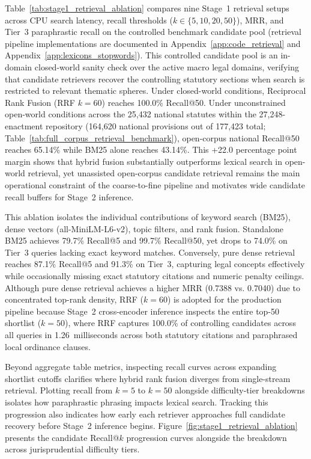 Table~\ref{tab:stage1_retrieval_ablation} compares nine Stage~1 retrieval setups across CPU search latency, recall thresholds ($k \in \{5, 10, 20, 50\}$), MRR, and Tier~3 paraphrastic recall on the controlled benchmark candidate pool (retrieval pipeline implementations are documented in Appendix~\ref{app:code_retrieval} and Appendix~\ref{app:lexicons_stopwords}). This controlled candidate pool is an in-domain closed-world sanity check over the active macro legal domains, verifying that candidate retrievers recover the controlling statutory sections when search is restricted to relevant thematic spheres. Under closed-world conditions, Reciprocal Rank Fusion (RRF $k=60$) reaches 100.0\% Recall@50. Under unconstrained open-world conditions across the 25,432 national statutes within the 27,248-enactment repository (164,620 national provisions out of 177,423 total; Table~\ref{tab:full_corpus_retrieval_benchmark}), open-corpus national Recall@50 reaches 65.14\% while BM25 alone reaches 43.14\%. This +22.0 percentage point margin shows that hybrid fusion substantially outperforms lexical search in open-world retrieval, yet unassisted open-corpus candidate retrieval remains the main operational constraint of the coarse-to-fine pipeline and motivates wide candidate recall buffers for Stage~2 inference.

This ablation isolates the individual contributions of keyword search (BM25), dense vectors (all-MiniLM-L6-v2), topic filters, and rank fusion. Standalone BM25 achieves 79.7\% Recall@5 and 99.7\% Recall@50, yet drops to 74.0\% on Tier~3 queries lacking exact keyword matches. Conversely, pure dense retrieval reaches 87.1\% Recall@5 and 91.3\% on Tier~3, capturing legal concepts effectively while occasionally missing exact statutory citations and numeric penalty ceilings. Although pure dense retrieval achieves a higher MRR (0.7388 vs. 0.7040) due to concentrated top-rank density, RRF ($k=60$) is adopted for the production pipeline because Stage~2 cross-encoder inference inspects the entire top-50 shortlist ($k=50$), where RRF captures 100.0\% of controlling candidates across all queries in 1.26~milliseconds across both statutory citations and paraphrased local ordinance clauses.

Beyond aggregate table metrics, inspecting recall curves across expanding shortlist cutoffs clarifies where hybrid rank fusion diverges from single-stream retrieval. Plotting recall from $k=5$ to $k=50$ alongside difficulty-tier breakdowns isolates how paraphrastic phrasing impacts lexical search. Tracking this progression also indicates how early each retriever approaches full candidate recovery before Stage~2 inference begins. Figure~\ref{fig:stage1_retrieval_ablation} presents the candidate Recall@$k$ progression curves alongside the breakdown across jurisprudential difficulty tiers.

